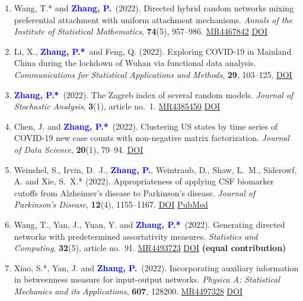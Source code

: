 \documentclass[12pt]{article}
\def\MR#1{\href{http://www.ams.org/mathscinet-getitem?mr=#1}{MR#1}}
\newcommand{\PZ}{\textcolor{blue}{\textbf{Zhang, P.*}}}
\newcommand{\PZnot}{\textcolor{blue}{\textbf{Zhang, P.}}}
\begin{document}
\begin{enumerate}
		\item {\sc Wang, T.*} and \PZnot\ (2022). Directed 
		hybrid random networks mixing preferential attachment with 
		uniform attachment mechanisms. {\em Annals of the Institute of Statistical Mathematics}, {\bf 74}(5), 957--986. \MR{4467842}
		\href{https://doi.org/10.1007/s10463-022-00827-5}
		{\underline{DOI}}
		
		\item {\sc Li, X.}, \PZ\ and {\sc Feng, Q.} (2022). Exploring COVID-19 in Mainland China during the lockdown of Wuhan via functional data analysis. {\em Communications for Statistical Applications and Methods}, {\bf 29}, 103--125. 
		\href{https://doi.org/10.29220/CSAM.2022.29.1.103}
		{\underline{DOI}}
		
		\item \PZ\ (2022). The Zagreb index of several random models. {\em Journal of Stochastic Analysis}, {\bf 3}(1), article no.\ 1. \MR{4385450}
		\href{https://doi.org/10.31390/josa.3.1.01}{\underline{DOI}}
		
		\item {\sc Chen, J.} and \PZ\ (2022). Clustering US states by time series of COVID-19 new case counts with non-negative matrix	factorization. {\em Journal of Data Science}, {\bf 20}(1), 79--94.
		\href{https://doi.org/10.6339/22-JDS1036}{\underline{DOI}}
		
		\item {\sc Weinshel, S., Irvin, D.\ J.,} \PZnot, {\sc Weintraub, D., Shaw, L.\ M., Siderowf, A. and Xie, S.\ X.*} (2022). Appropriateness of applying CSF biomarker cutoffs from Alzheimer’s disease to Parkinson’s disease. {\em Journal of Parkinson's Disease}, {\bf 12}(4), 1155--1167. 
		\href{https://doi.org/10.3233/JPD-212989}{\underline{DOI}} 
		\href{https://pubmed.ncbi.nlm.nih.gov/35431261}
		{\underline{PubMed}}
		
		\item {\sc Wang, T., Yan, J., Yuan, Y.} and \PZ\ (2022). 
		Generating directed networks with predetermined 
		assortativity measures. {\em Statistics and Computing}, {\bf 
		32}(5), article no.\ 91. \MR{4493723}
		\href{https://doi.org/10.1007/s11222-022-10161-8}{\underline{DOI}} {\bf (equal contribution)}
		
		\item {\sc Xiao, S.*, Yan, J.} and \PZnot\ (2022). 
		Incorporating auxiliary information in betweenness measure 
		for	input-output networks. {\em Physica A: Statistical 
		Mechanics and its Applications}, {\bf 607}, 128200. 
		\MR{4497328} 
		\href{https://doi.org/10.1016/j.physa.2022.128200}{\underline{DOI}}
		

\end{enumerate}
\end{document}
